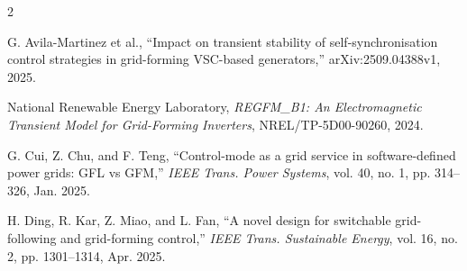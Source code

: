 \documentclass[12pt,a4paper]{article}
\begin{document}
\begin{multicols}{2}
\begin{enumerate}[label={[\arabic*]},leftmargin=1.8em,itemsep=0pt,topsep=0.1em]
\item\label{ref:avila} G. Avila-Martinez et al., ``Impact on transient stability of self-synchronisation control strategies in grid-forming VSC-based generators,'' arXiv:2509.04388v1, 2025.
\item\label{ref:regfmb1} National Renewable Energy Laboratory, \emph{REGFM\_B1: An Electromagnetic Transient Model for Grid-Forming Inverters}, NREL/TP-5D00-90260, 2024.
\item\label{ref:cui} G. Cui, Z. Chu, and F. Teng, ``Control-mode as a grid service in software-defined power grids: GFL vs GFM,'' \emph{IEEE Trans. Power Systems}, vol. 40, no. 1, pp. 314--326, Jan. 2025.
\item\label{ref:ding} H. Ding, R. Kar, Z. Miao, and L. Fan, ``A novel design for switchable grid-following and grid-forming control,'' \emph{IEEE Trans. Sustainable Energy}, vol. 16, no. 2, pp. 1301--1314, Apr. 2025.
\end{enumerate}
\end{multicols}
\end{document}
